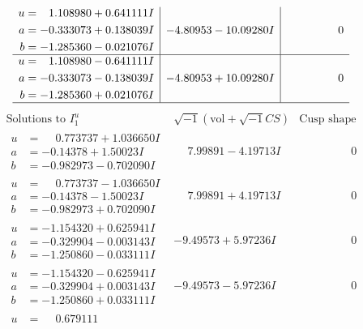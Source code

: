 \documentclass[1p]{elsarticle_modified}
\theoremstyle{definition}
\newcommand{\I}{\sqrt{-1}}
\begin{document}
$$\begin{array}{c|c|c}
\begin{aligned}
u &= \phantom{-}1.108980 + 0.641111 I \\
a &= -0.333073 + 0.138039 I \\
b &= -1.285360 - 0.021076 I\end{aligned}
 & -4.80953 - 10.09280 I & \phantom{-0.000000 } 0 \\ \hline\begin{aligned}
u &= \phantom{-}1.108980 - 0.641111 I \\
a &= -0.333073 - 0.138039 I \\
b &= -1.285360 + 0.021076 I\end{aligned}
 & -4.80953 + 10.09280 I & \phantom{-0.000000 } 0\\
 \hline 
 \end{array}$$\newpage$$\begin{array}{c|c|c}  
\text{Solutions to }I^u_{1}& \I (\text{vol} + \sqrt{-1}CS) & \text{Cusp shape}\\
 \hline 
\begin{aligned}
u &= \phantom{-}0.773737 + 1.036650 I \\
a &= -0.14378 + 1.50023 I \\
b &= -0.982973 - 0.702090 I\end{aligned}
 & \phantom{-}7.99891 - 4.19713 I & \phantom{-0.000000 } 0 \\ \hline\begin{aligned}
u &= \phantom{-}0.773737 - 1.036650 I \\
a &= -0.14378 - 1.50023 I \\
b &= -0.982973 + 0.702090 I\end{aligned}
 & \phantom{-}7.99891 + 4.19713 I & \phantom{-0.000000 } 0 \\ \hline\begin{aligned}
u &= -1.154320 + 0.625941 I \\
a &= -0.329904 - 0.003143 I \\
b &= -1.250860 - 0.033111 I\end{aligned}
 & -9.49573 + 5.97236 I & \phantom{-0.000000 } 0 \\ \hline\begin{aligned}
u &= -1.154320 - 0.625941 I \\
a &= -0.329904 + 0.003143 I \\
b &= -1.250860 + 0.033111 I\end{aligned}
 & -9.49573 - 5.97236 I & \phantom{-0.000000 } 0 \\ \hline\begin{aligned}
u &= \phantom{-}0.679111\phantom{ +0.000000I} \\

\end{aligned}
\end{array}$$
\end{document}
